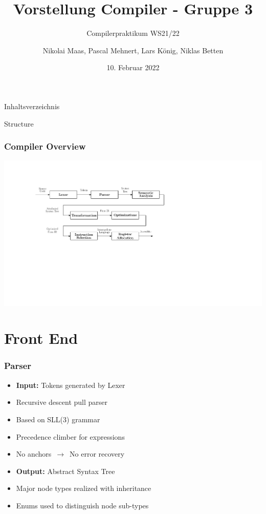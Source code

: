 \documentclass[navbaroff,en]{sdqbeamer}
\title{Vorstellung Compiler - Gruppe 3}
\subtitle{Compilerpraktikum WS21/22}
\author[Nikolai, Pascal, Lars, Niklas]{Nikolai Maas, Pascal Mehnert, Lars König, Niklas Betten}
\date[10.\,2.\,2022]{10. Februar 2022}
\begin{document}
\KITtitleframe

Inhaltsverzeichnis
\begin{frame}{Structure}
\tableofcontents
\end{frame}

\begin{frame}
	\frametitle{Compiler Overview}

	\centering \includegraphics[scale=0.5]{images/phases.ipe.pdf}

\end{frame}


\section{Front End}

\begin{frame}
	\frametitle{Parser}

	\begin{itemize}
		\item \textbf{Input:} Tokens generated by Lexer
		\item Recursive descent pull parser
		\item Based on SLL(3) grammar
		\item Precedence climber for expressions
		\item No anchors $\,\longrightarrow\,$ No error recovery

		\vspace{1em}

		\item \textbf{Output:} Abstract Syntax Tree
		\item Major node types realized with inheritance
		\item Enums used to distinguish node sub-types
	\end{itemize}

\end{frame}
\end{document}
